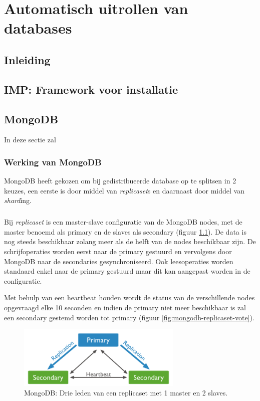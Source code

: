 \chapter{Automatisch uitrollen van databases}
\section{Inleiding}

\section{IMP: Framework voor installatie}

\section{MongoDB}
In deze sectie zal 

\subsection{Werking van MongoDB}
MongoDB heeft gekozen om bij gedistribueerde database op te splitsen in 2 keuzes, een eerste is door middel van \textit{replicaset}s en daarnaast door middel van \textit{shard}ing. 

\paragraph{}Bij \textit{replicaset} is een master-slave configuratie van de MongoDB nodes, met de master benoemd als primary en de slaves als secondary (figuur \ref{fig:mongodb-replicaset}). De data is nog steeds beschikbaar zolang meer als de helft van de nodes beschikbaar zijn. De schrijfoperaties worden eerst naar de primary gestuurd en vervolgens door MongoDB naar de secondaries gesynchroniseerd. Ook leesoperaties worden standaard enkel naar de primary gestuurd maar dit kan aangepast worden in de configuratie. 

Met behulp van een heartbeat houden wordt de status van de verschillende nodes opgevraagd elke 10 seconden en indien de primary niet meer beschikbaar is zal een secondary gestemd worden tot primary (figuur \ref{fig:mongodb-replicaset-vote}). 

\begin{figure}[!htb]
	    \centering
    \includegraphics[width=0.7\textwidth]{img/mongodb-replica-set-primary-with-two-secondaries.png}
    \caption{MongoDB: Drie leden van een replicaset met 1 master en 2 slaves. \cite{mongodb-replicaset}}
    \label{fig:mongodb-replicaset}
\end{figure}

